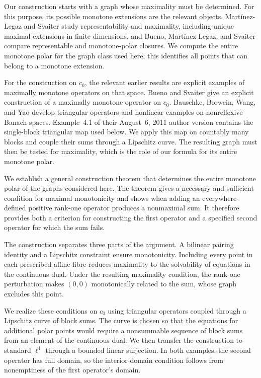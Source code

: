 Our construction starts with a graph whose maximality must be determined.
For this purpose, its possible monotone extensions are the relevant
objects. Mart\'{i}nez-Legaz and Svaiter \cite{martinezsvaiter2005}
study representability and maximality, including unique maximal extensions
in finite dimensions, and Bueno, Mart\'{i}nez-Legaz, and Svaiter
\cite{buenomartinezsvaiter2014} compare representable and monotone-polar
closures. We compute the entire monotone polar for the graph class used
here; this identifies all points that can belong to a monotone extension.

For the construction on $c_0$, the relevant earlier results are explicit
examples of maximally monotone operators on that space. Bueno and Svaiter
\cite{buenosvaiter2011} give an explicit construction of a maximally monotone operator
on $c_0$. Bauschke, Borwein, Wang, and Yao \cite{bauschkeetal2011}
develop triangular operators and nonlinear examples on nonreflexive
Banach spaces. Example~4.1 of their August~6, 2011 author version contains
the single-block triangular map used below. We apply this map on
countably many blocks and couple their sums through a Lipschitz curve.
The resulting graph must then be tested for maximality, which is the
role of our formula for its entire monotone polar.

We establish a general construction theorem that determines the entire
monotone polar of the graphs considered here. The theorem gives a
necessary and sufficient condition for maximal monotonicity and shows
when adding an everywhere-defined positive rank-one operator produces
a nonmaximal sum. It therefore provides both a criterion for constructing
the first operator and a specified second operator for which the sum fails.

The construction separates three parts of the argument. A bilinear
pairing identity and a Lipschitz constraint ensure monotonicity.
Including every point in each prescribed affine fibre reduces maximality
to the solvability of equations in the continuous dual. Under the
resulting maximality condition, the rank-one perturbation makes
$(0,0)$ monotonically related to the sum, whose graph excludes this point.

We realize these conditions on $c_0$ using triangular operators coupled
through a Lipschitz curve of block sums. The curve is chosen so that
the equations for additional polar points would require a nonsummable
sequence of block sums from an element of the continuous dual.
We then transfer the construction to standard $\ell^1$ through a bounded
linear surjection. In both examples, the second operator has full domain,
so the interior-domain condition follows from nonemptiness of the first
operator's domain.

